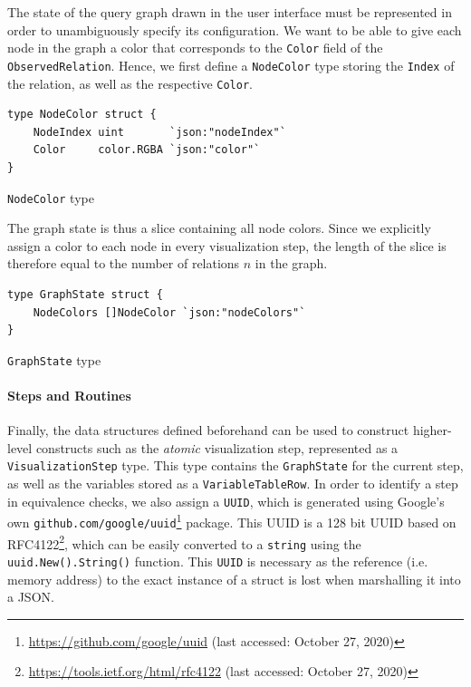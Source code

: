 The state of the query graph drawn in the user interface must be represented in order to unambiguously specify its configuration. We want to be able to give each node in the graph a color that corresponds to the \texttt{Color} field of the \texttt{ObservedRelation}. Hence, we first define a \texttt{NodeColor} type storing the \texttt{Index} of the relation, as well as the respective \texttt{Color}.

\begin{code}
\begin{verbatim}
type NodeColor struct {
    NodeIndex uint       `json:"nodeIndex"`
    Color     color.RGBA `json:"color"`
}
\end{verbatim}
\caption{\texttt{NodeColor} type}
\end{code}
\vspace{0.8cm}

The graph state is thus a slice containing all node colors. Since we explicitly assign a color to each node in every visualization step, the length of the slice is therefore equal to the number of relations $n$ in the graph.

\begin{code}
\begin{verbatim}
type GraphState struct {
    NodeColors []NodeColor `json:"nodeColors"`
}
\end{verbatim}
\caption{\texttt{GraphState} type}
\end{code}
\vspace{0.8cm}

\paragraph{Steps and Routines}

Finally, the data structures defined beforehand can be used to construct higher-level constructs such as the \textit{atomic} visualization step, represented as a \texttt{VisualizationStep} type. This type contains the \texttt{GraphState} for the current step, as well as the variables stored as a \texttt{VariableTableRow}. In order to identify a step in equivalence checks, we also assign a \texttt{UUID}, which is generated using Google's own \texttt{github.com/google/uuid}\footnote{\url{https://github.com/google/uuid} (last accessed: October 27, 2020)} package. This UUID is a 128 bit UUID based on RFC4122\footnote{\url{https://tools.ietf.org/html/rfc4122} (last accessed: October 27, 2020)}, which can be easily converted to a \texttt{string} using the \texttt{uuid.New().String()} function. This \texttt{UUID} is necessary as the reference (i.e. memory address) to the exact instance of a struct is lost when marshalling it into a JSON.

